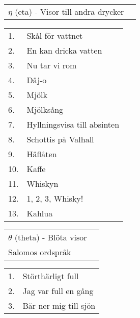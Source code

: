 \documentclass[a6paper,10pt]{article}
\begin{document}
\begin{table}[!ht]
\begin{tabularx}{1\textwidth}{l X}
\Large $\eta$ (eta) - Visor till andra drycker&
\end{tabularx}
\end{table}
\begin{table}[!ht]
\begin{tabularx}{1\textwidth}{l X}
1.&Skål för vattnet\\
2.&En kan dricka vatten\\
3.&Nu tar vi rom\\
4.&Däj-o\\
5.&Mjölk\\
6.&Mjölksång\\
7.&Hyllningsvisa till absinten\\
8.&Schottis på Valhall\\
9.&Häflåten\\
10.&Kaffe\\
11.&Whiskyn\\
12.&1, 2, 3, Whisky!\\
13.&Kahlua
\end{tabularx}
\end{table}
\begin{table}[!ht]
\begin{tabularx}{1\textwidth}{l X}
\Large $\theta$ (theta) - Blöta visor&\\
\normalsize Salomos ordspråk&
\end{tabularx}
\end{table}
\begin{table}[!ht]
\begin{tabularx}{1\textwidth}{l X}
1.&Störthärligt full\\
2.&Jag var full en gång\\
3.&Bär ner mig till sjön
\end{tabularx}
\end{table}
\end{document}
